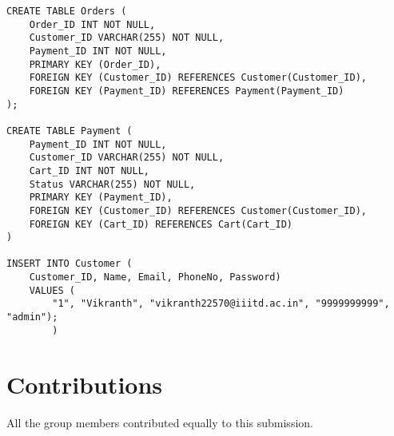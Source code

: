 \documentclass[12pt]{article}
\begin{document}
\begin{verbatim}
CREATE TABLE Orders (
    Order_ID INT NOT NULL,
    Customer_ID VARCHAR(255) NOT NULL,
    Payment_ID INT NOT NULL,
    PRIMARY KEY (Order_ID),
    FOREIGN KEY (Customer_ID) REFERENCES Customer(Customer_ID),
    FOREIGN KEY (Payment_ID) REFERENCES Payment(Payment_ID)
);

CREATE TABLE Payment (
    Payment_ID INT NOT NULL,
    Customer_ID VARCHAR(255) NOT NULL,
    Cart_ID INT NOT NULL,
    Status VARCHAR(255) NOT NULL,
    PRIMARY KEY (Payment_ID),
    FOREIGN KEY (Customer_ID) REFERENCES Customer(Customer_ID),
    FOREIGN KEY (Cart_ID) REFERENCES Cart(Cart_ID)
)

INSERT INTO Customer (
    Customer_ID, Name, Email, PhoneNo, Password)
    VALUES (
        "1", "Vikranth", "vikranth22570@iiitd.ac.in", "9999999999", "admin");
        )

\end{verbatim}

\section*{Contributions}
All the group members contributed equally to this submission.
\end{document}
